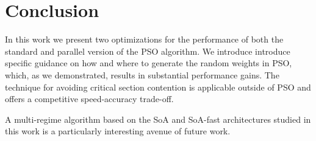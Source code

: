 \section{Conclusion}
In this work we present two optimizations for the performance of both the
standard and parallel version of the PSO algorithm. We introduce
introduce specific guidance on how and where to generate the random weights in
PSO, which, as we demonstrated, results in substantial performance gains. 
The technique for avoiding critical section contention is applicable outside of
PSO and offers a competitive speed-accuracy trade-off.

A multi-regime algorithm based on the SoA and SoA-fast architectures studied in
this work is a particularly interesting avenue of future work.


